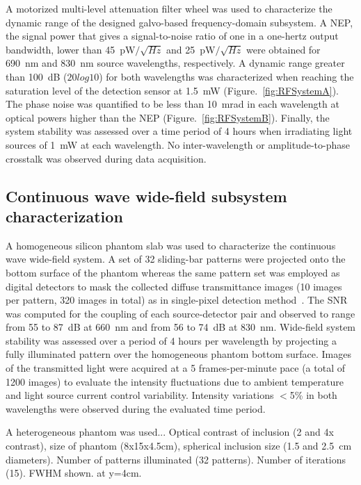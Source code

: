 A motorized multi-level attenuation filter wheel was used to characterize the dynamic range of the designed galvo-based frequency-domain subsystem. A \ac{NEP}, the signal power that gives a signal-to-noise ratio of one in a one-hertz output bandwidth, lower than 45~pW$/\sqrt{Hz}$ and 25~pW$/\sqrt{Hz}$ were obtained for 690~nm and 830~nm source wavelengths, respectively. A dynamic range greater than 100~dB ($20log10$) for both wavelengths was characterized when reaching the saturation level of the detection sensor at 1.5~mW (Figure.~\ref{fig:RFSystemA}). The phase noise was quantified to be less than 10~mrad in each wavelength at optical powers higher than the \ac{NEP} (Figure.~\ref{fig:RFSystemB}). Finally, the system stability was assessed over a time period of 4 hours when irradiating light sources of 1~mW at each wavelength. No inter-wavelength or amplitude-to-phase crosstalk was observed during data acquisition.


\subsection{Continuous wave wide-field subsystem characterization}
A homogeneous silicon phantom slab was used to characterize the continuous wave wide-field system. A set of 32 sliding-bar patterns were projected onto the bottom surface of the phantom whereas the same pattern set was employed as digital detectors to mask the collected diffuse transmittance images (10 images per pattern, 320 images in total) as in single-pixel detection method~\cite{Pian2015}. The \ac{SNR} was computed for the coupling of each source-detector pair and observed to range from 55 to 87~dB at 660~nm and from 56 to 74~dB at 830~nm. Wide-field system stability was assessed over a period of 4 hours per wavelength by projecting a fully illuminated pattern over the homogeneous phantom bottom surface. Images of the transmitted light were acquired at a 5 frames-per-minute pace (a total of 1200 images) to evaluate the intensity fluctuations due to ambient temperature and light source current control variability. Intensity variations $<$5\% in both wavelengths were observed during the evaluated time period.

A heterogeneous phantom was used...
Optical contrast of inclusion (2 and 4x contrast), size of phantom (8x15x4.5cm), spherical inclusion size (1.5 and 2.5~cm diameters).
Number of patterns illuminated (32 patterns). 
Number of iterations (15).
FWHM shown. at y=4cm.

